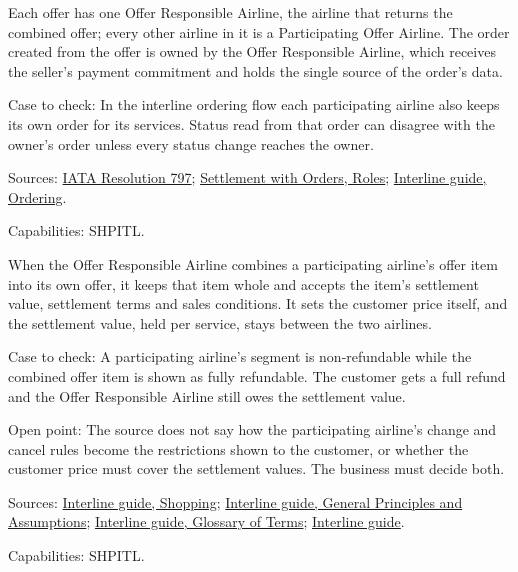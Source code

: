 \begin{theorem}
  \label{thm:offers-ora-owns-order}
  Each offer has one Offer Responsible Airline, the airline that returns the
  combined offer; every other airline in it is a Participating Offer
  Airline. The order created from the offer is owned by the Offer
  Responsible Airline, which receives the seller's payment commitment and
  holds the single source of the order's data.

  Case to check: In the interline ordering flow each participating airline
  also keeps its own order for its services. Status read from that order can
  disagree with the owner's order unless every status change reaches the
  owner.

  Sources: \href{https://www.iata.org/contentassets/72cbd60393ff42b5975d90ce9e049a7d/oneorder-resolution-797.pdf}{IATA Resolution 797};
  \href{https://standards.atlassian.net/wiki/spaces/SWO/pages/574816490/Roles}{Settlement with Orders, Roles};
  \href{https://standards.atlassian.net/wiki/spaces/SRSIA/pages/574685353/Ordering}{Interline guide, Ordering}.

  Capabilities: SHPITL.
\end{theorem}

\begin{definition}
  \label{def:offers-interline-offer-terms}
  \notready
  When the Offer Responsible Airline combines a participating airline's
  offer item into its own offer, it keeps that item whole and accepts the
  item's settlement value, settlement terms and sales conditions. It sets
  the customer price itself, and the settlement value, held per service,
  stays between the two airlines.

  Case to check: A participating airline's segment is non-refundable while
  the combined offer item is shown as fully refundable. The customer gets a
  full refund and the Offer Responsible Airline still owes the settlement
  value.

  Open point: The source does not say how the participating airline's change
  and cancel rules become the restrictions shown to the customer, or whether
  the customer price must cover the settlement values. The business must
  decide both.

  Sources: \href{https://standards.atlassian.net/wiki/spaces/SRSIA/pages/574816454/Shopping}{Interline guide, Shopping};
  \href{https://standards.atlassian.net/wiki/spaces/SRSIA/pages/574619905/General+Principles+and+Assumptions}{Interline guide, General Principles and Assumptions};
  \href{https://standards.atlassian.net/wiki/spaces/SRSIA/pages/574914728/Glossary+of+Terms}{Interline guide, Glossary of Terms};
  \href{https://standards.atlassian.net/wiki/spaces/SRSIA/overview}{Interline guide}.

  Capabilities: SHPITL.
\end{definition}

